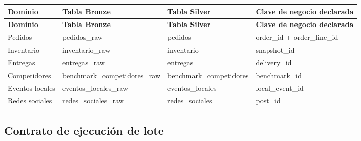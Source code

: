 \documentclass[11pt]{article}
\begin{document}
\begingroup\small
\begin{longtable}{@{}>{\raggedright\arraybackslash}p{}>{\raggedright\arraybackslash}p{}>{\raggedright\arraybackslash}p{}>{\raggedright\arraybackslash}p{}@{}}
\toprule
\textbf{Dominio} & \textbf{Tabla Bronze} & \textbf{Tabla Silver} & \textbf{Clave de negocio declarada} \\
\midrule
\endfirsthead
\toprule
\textbf{Dominio} & \textbf{Tabla Bronze} & \textbf{Tabla Silver} & \textbf{Clave de negocio declarada} \\
\midrule
\endhead
Pedidos & pedidos\_\allowbreak{}raw & pedidos & order\_\allowbreak{}id + order\_\allowbreak{}line\_\allowbreak{}id \\
Inventario & inventario\_\allowbreak{}raw & inventario & snapshot\_\allowbreak{}id \\
Entregas & entregas\_\allowbreak{}raw & entregas & delivery\_\allowbreak{}id \\
Competidores & benchmark\_\allowbreak{}competidores\_\allowbreak{}raw & benchmark\_\allowbreak{}competidores & benchmark\_\allowbreak{}id \\
Eventos locales & eventos\_\allowbreak{}locales\_\allowbreak{}raw & eventos\_\allowbreak{}locales & local\_\allowbreak{}event\_\allowbreak{}id \\
Redes sociales & redes\_\allowbreak{}sociales\_\allowbreak{}raw & redes\_\allowbreak{}sociales & post\_\allowbreak{}id \\
\bottomrule
\end{longtable}
\endgroup

\subsection{Contrato de ejecución de lote}
\end{document}
